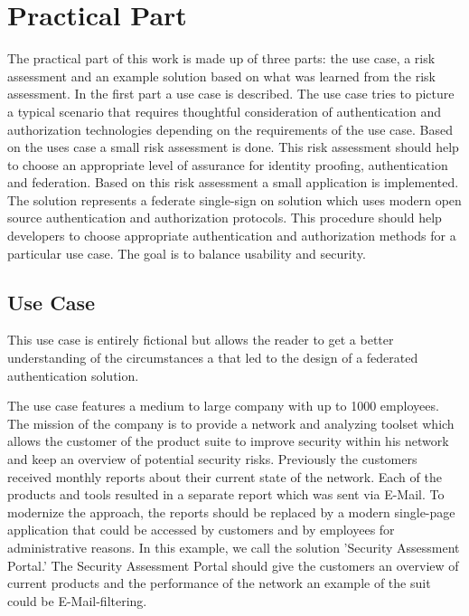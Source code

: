 \chapter{Practical Part}\label{chap:practicalPart}
\chapterstart

The practical part of this work is made up of three parts: the use case, a risk assessment and an example solution based on what was learned from the risk assessment. In the first part a use case is described. The use case tries to picture a typical scenario that requires thoughtful consideration of authentication and authorization technologies depending on the requirements of the use case. Based on the uses case a small risk assessment is done. This risk assessment should help to choose an appropriate level of assurance for identity proofing, authentication and federation. Based on this risk assessment a small application is implemented. The solution represents a federate single-sign on solution which uses modern open source authentication and authorization protocols. This procedure should help developers to choose appropriate authentication and authorization methods for a particular use case. The goal is to balance usability and security. 
\section{Use Case}
This use case is entirely fictional but allows the reader to get a better understanding of the circumstances a that led to the design of a federated authentication solution. 

The use case features a medium to large company with up to 1000 employees. The mission of the company is to provide a network and analyzing toolset which allows the customer of the product suite to improve security within his network and keep an overview of potential security risks. Previously the customers received monthly reports about their current state of the network. Each of the products and tools resulted in a separate report which was sent via E-Mail. To modernize the approach, the reports should be replaced by a modern single-page application that could be accessed by customers and by employees for administrative reasons. In this example, we call the solution 'Security Assessment Portal.' The Security Assessment Portal should give the customers an overview of current products and the performance of the network an example of the suit could be E-Mail-filtering.  

